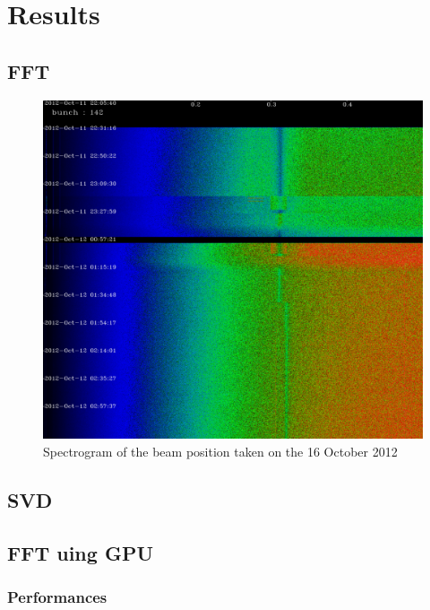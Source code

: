 %

\chapter{Results}

\section{FFT}

\begin{figure}
\caption{Spectrogram of the beam position taken on the 16 October 2012}
\centering
\includegraphics[scale=0.2]{spectrogram.pdf}
\end{figure}

\section{SVD}

\section{FFT uing GPU}

   \subsection{Performances}

